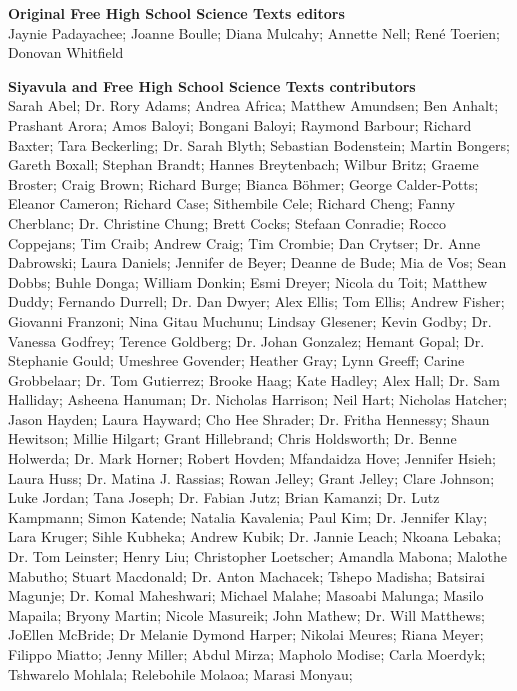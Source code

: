 \textbf{\LARGE Original Free High School Science Texts editors}\\

Jaynie Padayachee; Joanne Boulle; Diana Mulcahy; Annette Nell; René Toerien; Donovan Whitfield \par

\textbf{\LARGE Siyavula and Free High School Science Texts contributors}\\

Sarah Abel; Dr. Rory Adams; Andrea Africa; Matthew Amundsen; Ben Anhalt; Prashant Arora; Amos Baloyi; Bongani
Baloyi; Raymond Barbour; Richard Baxter; Tara Beckerling; Dr. Sarah Blyth; Sebastian Bodenstein; Martin Bongers;
Gareth Boxall; Stephan Brandt; Hannes Breytenbach; Wilbur Britz; Graeme Broster; Craig Brown; Richard Burge;
Bianca Böhmer; George Calder-Potts; Eleanor Cameron; Richard Case; Sithembile Cele; Richard Cheng; Fanny
Cherblanc; Dr. Christine Chung; Brett Cocks; Stefaan Conradie; Rocco Coppejans; Tim Craib; Andrew Craig; Tim
Crombie; Dan Crytser; Dr. Anne Dabrowski; Laura Daniels; Jennifer de Beyer; Deanne de Bude; Mia de Vos; Sean
Dobbs; Buhle Donga; William Donkin; Esmi Dreyer; Nicola du Toit; Matthew Duddy; Fernando Durrell; Dr. Dan
Dwyer; Alex Ellis; Tom Ellis; Andrew Fisher; Giovanni Franzoni; Nina Gitau Muchunu; Lindsay Glesener; Kevin
Godby; Dr. Vanessa Godfrey; Terence Goldberg; Dr. Johan Gonzalez; Hemant Gopal; Dr. Stephanie Gould; Umeshree
Govender; Heather Gray; Lynn Greeff; Carine Grobbelaar; Dr. Tom Gutierrez; Brooke Haag; Kate Hadley; Alex Hall;
Dr. Sam Halliday; Asheena Hanuman; Dr. Nicholas Harrison; Neil Hart; Nicholas Hatcher; Jason Hayden; Laura
Hayward; Cho Hee Shrader; Dr. Fritha Hennessy; Shaun Hewitson; Millie Hilgart; Grant Hillebrand; Chris Holdsworth;
Dr. Benne Holwerda; Dr. Mark Horner; Robert Hovden; Mfandaidza Hove; Jennifer Hsieh; Laura Huss; Dr. Matina J.
Rassias; Rowan Jelley; Grant Jelley; Clare Johnson; Luke Jordan; Tana Joseph; Dr. Fabian Jutz; Brian Kamanzi; Dr.
Lutz Kampmann; Simon Katende; Natalia Kavalenia; Paul Kim; Dr. Jennifer Klay; Lara Kruger; Sihle Kubheka;
Andrew Kubik; Dr. Jannie Leach; Nkoana Lebaka; Dr. Tom Leinster; Henry Liu; Christopher Loetscher; Amandla
Mabona; Malothe Mabutho; Stuart Macdonald; Dr. Anton Machacek; Tshepo Madisha; Batsirai Magunje; Dr. Komal
Maheshwari; Michael Malahe; Masoabi Malunga; Masilo Mapaila; Bryony Martin; Nicole Masureik; John Mathew; Dr.
Will Matthews; JoEllen McBride; Dr Melanie Dymond Harper; Nikolai Meures; Riana Meyer; Filippo Miatto; Jenny
Miller; Abdul Mirza; Mapholo Modise; Carla Moerdyk; Tshwarelo Mohlala; Relebohile Molaoa; Marasi Monyau;
